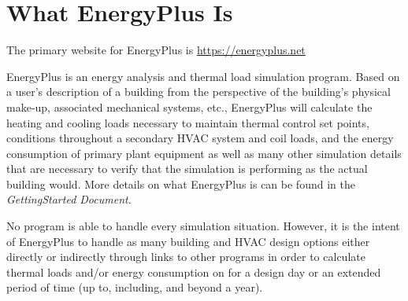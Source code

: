 \section{What EnergyPlus Is}\label{what-energyplus-is}

The primary website for EnergyPlus is \url{https://energyplus.net}

EnergyPlus is an energy analysis and thermal load simulation program. Based on a user's description of a building from the perspective of the building's physical make-up, associated mechanical systems, etc., EnergyPlus will calculate the heating and cooling loads necessary to maintain thermal control set points, conditions throughout a secondary HVAC system and coil loads, and the energy consumption of primary plant equipment as well as many other simulation details that are necessary to verify that the simulation is performing as the actual building would. More details on what EnergyPlus is can be found in the \emph{GettingStarted Document}.

No program is able to handle every simulation situation. However, it is the intent of EnergyPlus to handle as many building and HVAC design options either directly or indirectly through links to other programs in order to calculate thermal loads and/or energy consumption on for a design day or an extended period of time (up to, including, and beyond a year).
